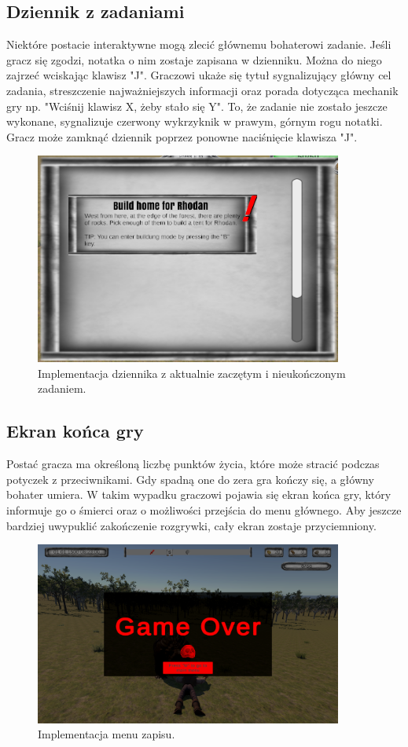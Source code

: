 \subsection{Dziennik z zadaniami}
Niektóre postacie interaktywne mogą zlecić głównemu bohaterowi zadanie. Jeśli gracz się zgodzi, notatka o nim zostaje zapisana w dzienniku. Można do niego zajrzeć
wciskając klawisz "J". Graczowi ukaże się tytuł sygnalizujący główny cel zadania, streszczenie najważniejszych informacji oraz porada dotycząca mechanik gry np. 
"Wciśnij klawisz X, żeby stało się Y". To, że zadanie nie zostało jeszcze wykonane, sygnalizuje czerwony wykrzyknik w prawym, górnym rogu notatki. Gracz może 
zamknąć dziennik poprzez ponowne naciśnięcie klawisza "J".
\begin{figure}[htbp]
    \centering
    \includegraphics[width=0.9\textwidth]{images/ui/journal_quest.png}
    \caption{Implementacja dziennika z aktualnie zaczętym i nieukończonym zadaniem.}\label{fig:end_sc}
\end{figure}

\subsection{Ekran końca gry}
Postać gracza ma określoną liczbę punktów życia, które może stracić podczas potyczek z przeciwnikami. Gdy spadną one do zera gra kończy się, a główny bohater umiera.
W takim wypadku graczowi pojawia się ekran końca gry, który informuje go o śmierci oraz o możliwości przejścia do menu głównego. Aby jeszcze bardziej uwypuklić zakończenie 
rozgrywki, cały ekran zostaje przyciemniony.
\begin{figure}[htbp]
    \centering
    \includegraphics[width=0.9\textwidth]{images/ui/endgame_screen.png}
    \caption{Implementacja menu zapisu.}\label{fig:end_sc}
\end{figure}
